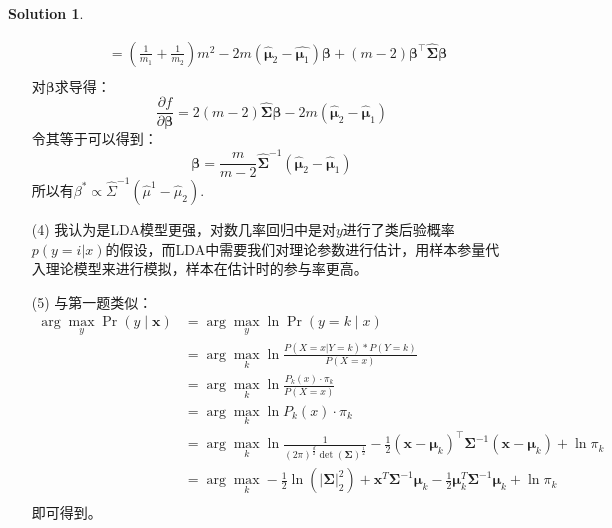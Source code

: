\documentclass[a4paper,UTF8]{article}
\theoremstyle{definition}
\newtheorem*{solution}{Solution}
\begin{document}
\begin{solution}
\begin{enumerate}
\begin{align*}
			        & = (\frac{1}{m_1}+\frac{1}{m_2})m^2-2m(\hat{\bm{\mu}}_2-\hat{\bm{\mu}_1})\bm{\beta}+(m-2)\bm{\beta}^{\top}\hat{\bm{\Sigma}}\bm{\beta} \\
		      \end{align*}
		      对$\bm{\beta}$求导得：
		      \[\frac{\partial f}{\partial \bm{\beta}}=2(m-2)\hat{\bm{\Sigma}}\bm{\beta}-2m(\hat{\bm{\mu}}_2-\hat{\bm{\mu}}_1)\]
		      令其等于可以得到：
		      \[\bm{\beta}=\frac{m}{m-2}\hat{\bm{\Sigma}}^{-1}(\hat{\bm{\mu}}_2-\hat{\bm{\mu}}_1)\]
		      所以有$\beta^{*} \propto \hat{\Sigma}^{-1}\left(\hat{\mu}^{1}-\hat{\mu}_{2}\right)$.
		\item [(4)]
		      我认为是LDA模型更强，对数几率回归中是对$y$进行了类后验概率$p(y=i|x)$的假设，而LDA中需要我们对理论参数进行估计，用样本参量代入理论模型来进行模拟，样本在估计时的参与率更高。
		\item [(5)]
		      与第一题类似：
		      \begin{align*}
			      \arg \max_y \Pr(y\mid \bm{x}) & = \arg \max_y \ln \Pr(y=k\mid x)                                                                                                                                                                                                          \\
			                                    & = \arg \max_k \ln \frac{P(X = x | Y = k)*P(Y=k)}{P(X = x)}                                                                                                                                                                                \\
			                                    & = \arg \max_k \ln \frac{P_{k}(x) \cdot \pi_{k}}{P(X=x)}                                                                                                                                                                                   \\
			                                    & = \arg \max_k \ln P_{k}(x) \cdot \pi_{k}                                                                                                                                                                                                  \\
			                                    & = \arg \max_k \ln \frac{1}{(2 \pi)^{\frac{d}{2}} \det(\bm{\Sigma})^{\frac{1}{2}}}-\frac{1}{2}\left(\boldsymbol{x}-\boldsymbol{\mu}_{k}\right)^{\top} \boldsymbol{\Sigma}^{-1}\left(\boldsymbol{x}-\boldsymbol{\mu}_{k}\right)+\ln \pi_{k} \\
			                                    & = \arg \max_k -\frac{1}{2}\ln (|\bm{\Sigma}|_2^2)+ \boldsymbol{x}^{T} \boldsymbol{\Sigma}^{-1} \boldsymbol{\mu}_{k}-\frac{1}{2} \boldsymbol{\mu}_{k}^{T} \boldsymbol{\Sigma}^{-1} \boldsymbol{\mu}_{k}+\ln \pi_{k}                        \\
		      \end{align*}
		      即可得到。
	\end{enumerate}
\end{solution}
\end{document}
